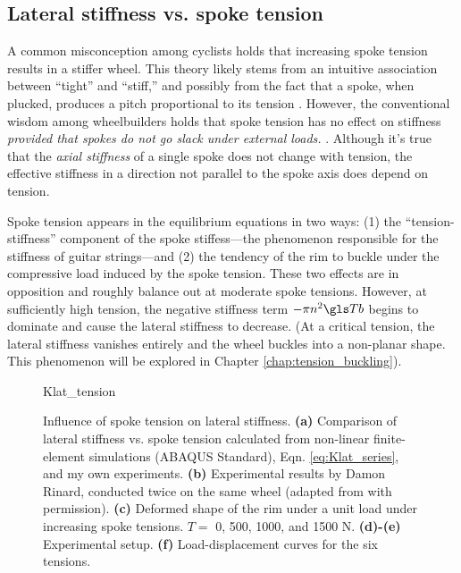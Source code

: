 \documentclass[\rootdir/thesis.tex]{subfiles}
\begin{document}
\subsection{Lateral stiffness vs. spoke tension}

A common misconception among cyclists holds that increasing spoke tension results in a stiffer wheel. This theory likely stems from an intuitive association between ``tight'' and ``stiff,'' and possibly from the fact that a spoke, when plucked, produces a pitch proportional to its tension \cite{Allen1997}. However, the conventional wisdom among wheelbuilders holds that spoke tension has no effect on stiffness \emph{provided that spokes do not go slack under external loads.} \cite{Rinard,Kopecky2013,Hjertberg2014}. Although it's true that the \emph{axial stiffness} of a single spoke does not change with tension, the effective stiffness in a direction not parallel to the spoke axis does depend on tension.

Spoke tension appears in the equilibrium equations in two ways: (1) the ``tension-stiffness'' component of the spoke stiffess---the phenomenon responsible for the stiffness of guitar strings---and (2) the tendency of the rim to buckle under the compressive load induced by the spoke tension. These two effects are in opposition and roughly balance out at moderate spoke tensions. However, at sufficiently high tension, the negative stiffness term $-\pi n^2 \Tb$ begins to dominate and cause the lateral stiffness to decrease. (At a critical tension, the lateral stiffness vanishes entirely and the wheel buckles into a non-planar shape. This phenomenon will be explored in Chapter \ref{chap:tension_buckling}).

\begin{figure}[t]
\centering
{Klat_tension}
\caption{Influence of spoke tension on lateral stiffness. \textbf{(a)} Comparison of lateral stiffness vs. spoke tension calculated from non-linear finite-element simulations (ABAQUS Standard), Eqn. \eqref{eq:Klat_series}, and my own experiments. \textbf{(b)} Experimental results by Damon Rinard, conducted twice on the same wheel (adapted from \cite{Rinard} with permission). \textbf{(c)} Deformed shape of the rim under a unit load under increasing spoke tensions. $T=\,\,$0, 500, 1000, and 1500 N. \textbf{(d)-(e)} Experimental setup. \textbf{(f)} Load-displacement curves for the six tensions.}
\label{fig:Klat_tension}
\end{figure}
\end{document}
